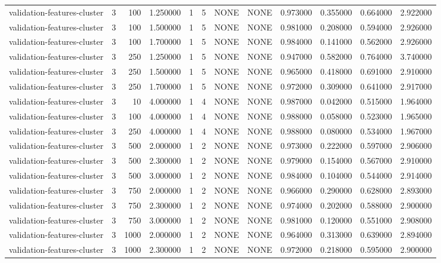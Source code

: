 \begin{tabular}{lrrrllllrrrr}
validation-features-cluster & 3 & 100 & 1.250000 & 1 & 5 & NONE & NONE & 0.973000 & 0.355000 & 0.664000 & 2.922000 \\
validation-features-cluster & 3 & 100 & 1.500000 & 1 & 5 & NONE & NONE & 0.981000 & 0.208000 & 0.594000 & 2.926000 \\
validation-features-cluster & 3 & 100 & 1.700000 & 1 & 5 & NONE & NONE & 0.984000 & 0.141000 & 0.562000 & 2.926000 \\
validation-features-cluster & 3 & 250 & 1.250000 & 1 & 5 & NONE & NONE & 0.947000 & 0.582000 & 0.764000 & 3.740000 \\
validation-features-cluster & 3 & 250 & 1.500000 & 1 & 5 & NONE & NONE & 0.965000 & 0.418000 & 0.691000 & 2.910000 \\
validation-features-cluster & 3 & 250 & 1.700000 & 1 & 5 & NONE & NONE & 0.972000 & 0.309000 & 0.641000 & 2.917000 \\
validation-features-cluster & 3 & 10 & 4.000000 & 1 & 4 & NONE & NONE & 0.987000 & 0.042000 & 0.515000 & 1.964000 \\
validation-features-cluster & 3 & 100 & 4.000000 & 1 & 4 & NONE & NONE & 0.988000 & 0.058000 & 0.523000 & 1.965000 \\
validation-features-cluster & 3 & 250 & 4.000000 & 1 & 4 & NONE & NONE & 0.988000 & 0.080000 & 0.534000 & 1.967000 \\
validation-features-cluster & 3 & 500 & 2.000000 & 1 & 2 & NONE & NONE & 0.973000 & 0.222000 & 0.597000 & 2.906000 \\
validation-features-cluster & 3 & 500 & 2.300000 & 1 & 2 & NONE & NONE & 0.979000 & 0.154000 & 0.567000 & 2.910000 \\
validation-features-cluster & 3 & 500 & 3.000000 & 1 & 2 & NONE & NONE & 0.984000 & 0.104000 & 0.544000 & 2.914000 \\
validation-features-cluster & 3 & 750 & 2.000000 & 1 & 2 & NONE & NONE & 0.966000 & 0.290000 & 0.628000 & 2.893000 \\
validation-features-cluster & 3 & 750 & 2.300000 & 1 & 2 & NONE & NONE & 0.974000 & 0.202000 & 0.588000 & 2.900000 \\
validation-features-cluster & 3 & 750 & 3.000000 & 1 & 2 & NONE & NONE & 0.981000 & 0.120000 & 0.551000 & 2.908000 \\
validation-features-cluster & 3 & 1000 & 2.000000 & 1 & 2 & NONE & NONE & 0.964000 & 0.313000 & 0.639000 & 2.894000 \\
validation-features-cluster & 3 & 1000 & 2.300000 & 1 & 2 & NONE & NONE & 0.972000 & 0.218000 & 0.595000 & 2.900000 \\

\end{tabular}
